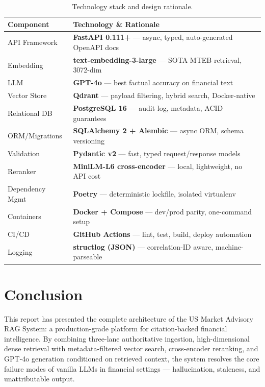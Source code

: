 \documentclass[10pt,a4paper,twocolumn]{article}
\begin{document}
\begin{table}[H]
\centering
\caption{Technology stack and design rationale.}
\label{tab:stack}
\scriptsize
\begin{tabularx}{\columnwidth}{lX}
\toprule
\textbf{Component} & \textbf{Technology \& Rationale} \\
\midrule
API Framework    & \textbf{FastAPI 0.111+} --- async, typed, auto-generated OpenAPI docs \\
Embedding        & \textbf{text-embedding-3-large} --- SOTA MTEB retrieval, 3072-dim \\
LLM              & \textbf{GPT-4o} --- best factual accuracy on financial text \\
Vector Store     & \textbf{Qdrant} --- payload filtering, hybrid search, Docker-native \\
Relational DB    & \textbf{PostgreSQL 16} --- audit log, metadata, ACID guarantees \\
ORM/Migrations   & \textbf{SQLAlchemy 2 + Alembic} --- async ORM, schema versioning \\
Validation       & \textbf{Pydantic v2} --- fast, typed request/response models \\
Reranker         & \textbf{MiniLM-L6 cross-encoder} --- local, lightweight, no API cost \\
Dependency Mgmt  & \textbf{Poetry} --- deterministic lockfile, isolated virtualenv \\
Containers       & \textbf{Docker + Compose} --- dev/prod parity, one-command setup \\
CI/CD            & \textbf{GitHub Actions} --- lint, test, build, deploy automation \\
Logging          & \textbf{structlog (JSON)} --- correlation-ID aware, machine-parseable \\
\bottomrule
\end{tabularx}
\end{table}

\section{Conclusion}

This report has presented the complete architecture of the US Market Advisory RAG System:
a production-grade platform for citation-backed financial intelligence. By combining
three-lane authoritative ingestion, high-dimensional dense retrieval with metadata-filtered
vector search, cross-encoder reranking, and GPT-4o generation conditioned on retrieved
context, the system resolves the core failure modes of vanilla LLMs in financial settings ---
hallucination, staleness, and unattributable output.
\end{document}
